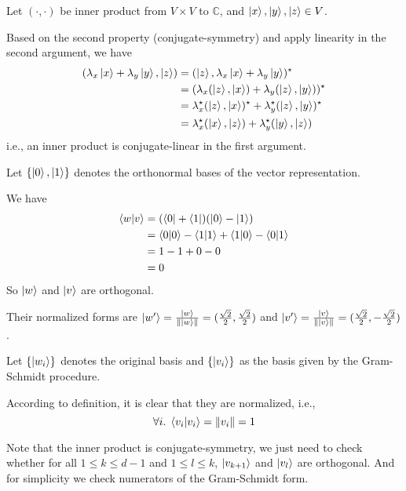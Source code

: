 \documentclass{homeworg}
\begin{document}
\exercise*

Let $(\cdot,\cdot)$ be inner product from $V\times V$ to $\mathbb{C}$, and $\ket{x},\ket{y},\ket{z}\in V$.

Based on the second property (conjugate-symmetry) and apply linearity in the second argument, we have
\begin{align}
    (\lambda_x\ket{x}+\lambda_y \ket{y},\ket{z})&=(\ket{z},\lambda_x\ket{x}+\lambda_y \ket{y})^\star\nonumber\\
    &=(\lambda_x(\ket{z},\ket{x})+\lambda_y(\ket{z},\ket{y}))^\star\nonumber\\
    &=\lambda_x^\star(\ket{z},\ket{x})^\star + \lambda_y^\star(\ket{z},\ket{y})^\star\nonumber\\
    &=\lambda_x^\star(\ket{x},\ket{z}) + \lambda_y^\star(\ket{y},\ket{z})\nonumber
\end{align}
i.e., an inner product is conjugate-linear in the first
 argument.

\exercise*

Let $\{\ket{0},\ket{1}\}$ denotes the orthonormal bases of the vector representation.

We have
\begin{align}
\braket{w|v}&=(\bra{0}+\bra{1})(\ket{0}-\ket{1})\nonumber\\
&=\braket{0|0}-\braket{1|1}+\braket{1|0}-\braket{0|1}\nonumber\\
&=1-1+0-0\nonumber\\
&=0\nonumber
\end{align}
So $\ket{w}$ and $\ket{v}$ are orthogonal.

Their normalized forms are $\ket{w^\prime}=\frac{\ket{w}}{\left\|\ket{w}\right\|}=(\frac{\sqrt{2}}{2},\frac{\sqrt{2}}{2})$ and $\ket{v^\prime}=\frac{\ket{v}}{\left\|\ket{v}\right\|}=(\frac{\sqrt{2}}{2},-\frac{\sqrt{2}}{2})$.

\exercise*
Let $\{\ket{w_i}\}$ denotes the original basis and $\{\ket{v_i}\}$ as the basis given by the Gram-Schmidt procedure.

According to definition, it is clear that they are normalized, i.e.,
\[\forall{i}.\;\braket{v_i|v_i}=\left\|v_i\right\|=1\]

Note that the inner product is conjugate-symmetry, we just need to check whether for all $1\leq k\leq d-1$ and $1\leq l\leq k$, $\ket{v_{k+1}}$ and $\ket{v_l}$ are orthogonal. And for simplicity we check numerators of the Gram-Schmidt form.
\end{document}
